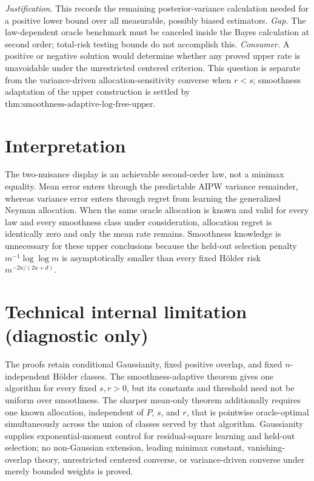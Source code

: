 \documentclass{article}
\begin{document}
\par\smallskip\noindent \textit{Justification.} This records the remaining posterior-variance calculation needed for a positive lower bound over all measurable, possibly biased estimators. \textit{Gap.} The law-dependent oracle benchmark must be canceled inside the Bayes calculation at second order; total-risk testing bounds do not accomplish this. \textit{Consumer.} A positive or negative solution would determine whether any proved upper rate is unavoidable under the unrestricted centered criterion. This question is separate from the variance-driven allocation-sensitivity converse when \(r<s\); smoothness adaptation of the upper construction is settled by \(\text{thm:smoothness-adaptive-log-free-upper}\).

\section{Interpretation}

The two-nuisance display is an achievable second-order law, not a minimax equality. Mean error enters through the predictable AIPW variance remainder, whereas variance error enters through regret from learning the generalized Neyman allocation. When the same oracle allocation is known and valid for every law and every smoothness class under consideration, allocation regret is identically zero and only the mean rate remains. Smoothness knowledge is unnecessary for these upper conclusions because the held-out selection penalty \(m^{-1}\log\log m\) is asymptotically smaller than every fixed Hölder risk \(m^{-2u/(2u+d)}\).

\section*{Technical internal limitation (diagnostic only)}

The proofs retain conditional Gaussianity, fixed positive overlap, and fixed \(n\)-independent Hölder classes. The smoothness-adaptive theorem gives one algorithm for every fixed \(s,r>0\), but its constants and threshold need not be uniform over smoothness. The sharper mean-only theorem additionally requires one known allocation, independent of \(P\), \(s\), and \(r\), that is pointwise oracle-optimal simultaneously across the union of classes served by that algorithm. Gaussianity supplies exponential-moment control for residual-square learning and held-out selection; no non-Gaussian extension, leading minimax constant, vanishing-overlap theory, unrestricted centered converse, or variance-driven converse under merely bounded weights is proved.
\end{document}
